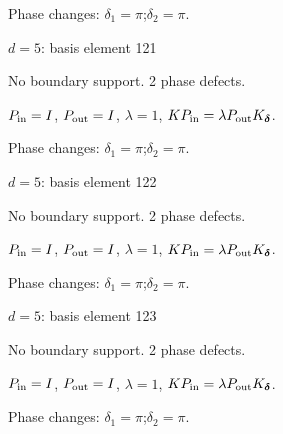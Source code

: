 \par\smallskip\begin{minipage}{.98\linewidth}\small Phase changes: $\delta_{1}=\pi$;\quad $\delta_{2}=\pi$.\end{minipage}
\vfill
{\footnotesize\texttt{}}
\newpage
{}
{\Large $d=5$: basis element 121}\par
No boundary support. 2 phase defects.
\begin{center}
\end{center}
\vspace{-1mm}
$P_{\rm in}=I$, \quad $P_{\rm out}=I$, \quad $\lambda=1$, \qquad $K P_{\rm in}=\lambda P_{\rm out}K_{\boldsymbol\delta}$.
\par\smallskip\begin{minipage}{.98\linewidth}\small Phase changes: $\delta_{1}=\pi$;\quad $\delta_{2}=\pi$.\end{minipage}
\vfill
{\footnotesize\texttt{}}
\newpage
{}
{\Large $d=5$: basis element 122}\par
No boundary support. 2 phase defects.
\begin{center}
\end{center}
\vspace{-1mm}
$P_{\rm in}=I$, \quad $P_{\rm out}=I$, \quad $\lambda=1$, \qquad $K P_{\rm in}=\lambda P_{\rm out}K_{\boldsymbol\delta}$.
\par\smallskip\begin{minipage}{.98\linewidth}\small Phase changes: $\delta_{1}=\pi$;\quad $\delta_{2}=\pi$.\end{minipage}
\vfill
{\footnotesize\texttt{}}
\newpage
{}
{\Large $d=5$: basis element 123}\par
No boundary support. 2 phase defects.
\begin{center}
\end{center}
\vspace{-1mm}
$P_{\rm in}=I$, \quad $P_{\rm out}=I$, \quad $\lambda=1$, \qquad $K P_{\rm in}=\lambda P_{\rm out}K_{\boldsymbol\delta}$.
\par\smallskip\begin{minipage}{.98\linewidth}\small Phase changes: $\delta_{1}=\pi$;\quad $\delta_{2}=\pi$.\end{minipage}
